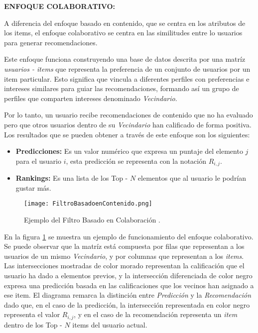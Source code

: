 \newpage
\thispagestyle{plain}
\vspace*{0.2cm}

\textbf{ENFOQUE COLABORATIVO:}

A diferencia del enfoque basado en contenido, que se centra en los atributos de los items, el enfoque colaborativo se centra en las similitudes entre lo usuarios para generar recomendaciones.

Este enfoque funciona construyendo una base de datos descrita por una matríz \textit{usuarios - items} que representa la preferencia de un conjunto de usuarios por un item particular. Esto significa que vincula a diferentes perfiles con preferencias e intereses similares para guiar las recomendaciones, formando así un grupo  de perfiles que comparten intereses denominado \textit{Vecindario}. 


Por lo tanto, un usuario recibe recomendaciones de contenido que no ha evaluado pero que otros usuarios dentro de su \textit{Vecindario} han calificado de forma positiva. Los resultados que se pueden obtener a través de este enfoque son los siguientes:

\begin{itemize}
    \item \textbf{Predicciones: } Es un valor numérico que expresa un puntaje del elemento $j$ para el usuario $i$, esta predicción se representa con la notación $R_{i,j}$.
    \item \textbf{Rankings: } Es una lista de los Top - $N$ elementos que al usuario le podrían gustar más.
\end{itemize}

\begin{figure}[h!]
    \centering
    \texttt{[image: FiltroBasadoenContenido.png]}
    \caption{Ejemplo del Filtro Basado en Colaboración \parencite{ISINKAYE2015261}.}
    \label{fig:FiltroColaborativo}
\end{figure}

\newpage
\thispagestyle{plain}
\vspace*{0.2cm}


En la figura \ref{fig:FiltroColaborativo} se muestra un ejemplo de funcionamiento del enfoque colaborativo. Se puede observar que la matríz está compuesta por filas que representan a los usuarios de un mismo \textit{Vecindario}, y por columnas que representan a los \textit{items}. Las intersecciones mostradas de color morado representan la calificación que el usuario ha dado a elementos previos, y la intersección diferenciada de color negro expresa una predicción basada en las calificaciones que los vecinos han asignado a ese item.
El diagrama remarca la distinción entre \textit{Predicción} y la \textit{Recomendación} dado que, en el caso de la predicción,  la intersección representada en color negro representa el valor $R_{i,j}$, y en el caso de la recomendación representa un \textit{item} dentro de los Top - $N$ items del usuario actual.

